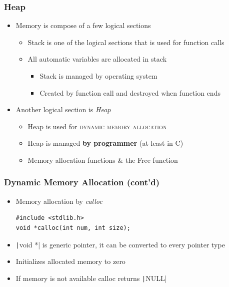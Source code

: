 \documentclass{../c-lecture}
\begin{document}
\begin{frame}
  \frametitle{Heap}
  \begin{itemize}
    \item Memory is compose of a few logical sections
    \begin{itemize}
      \item
        Stack is one of the logical sections that is used for function calls
      \item All automatic variables are allocated in stack
      \begin{itemize}
        \item Stack is managed by operating system
        \item Created by function call and destroyed when function ends
      \end{itemize}
    \end{itemize}
    \item Another logical section is \textit{\color{YellowOrange} Heap}
    \begin{itemize}
      \item
        Heap is used for \textsc{\color{LimeGreen} dynamic memory allocation}
      \item
        Heap is managed \textbf{\color{RubineRed} by programmer} (at least
        in C)
      \item Memory allocation functions \& the Free function
    \end{itemize}
  \end{itemize}
\end{frame}

\begin{frame}[fragile]
  \frametitle{Dynamic Memory Allocation (cont’d)}
  \begin{itemize}
    \item Memory allocation by \textit{\color{YellowOrange} calloc}
    \begin{verbatim}
#include <stdlib.h>
void *calloc(int num, int size);
    \end{verbatim}
    \item
      \texttt|void *| is generic pointer, it can be
      converted to every pointer type
    \item Initializes allocated memory to zero
    \item If memory is not available calloc returns \texttt|NULL|
  \end{itemize}
\end{frame}
\end{document}
